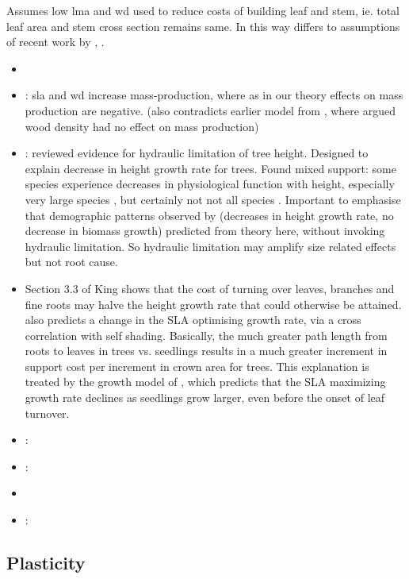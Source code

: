 \documentclass[a4paper,11pt]{article}
\begin{document}
Assumes low lma and wd used to reduce costs of building leaf and stem, ie. total leaf area and stem cross section remains same. In this way differs to assumptions of recent work by \citep{Anten-2010}, \citep{Larjavaara-2010}.



\begin{itemize}
  \item \citet{Ishihara-2016}
  \item  \citet{Enquist-2007}: sla and wd increase mass-production, where as in our theory effects on mass production are negative. (also contradicts earlier model from \citet{Enquist-1999}, where argued wood density had no effect on mass production)
  \item \citet{Ryan-2006}: reviewed evidence for hydraulic limitation of tree height. Designed to explain decrease in height growth rate for trees. Found mixed support: some species experience decreases in physiological function with height, especially very large species \citep{Koch-2004}, but certainly not not all species \citep{Ryan-2006}. Important to emphasise that demographic patterns observed by \citep{Ryan-2006} (decreases in height growth rate, no decrease in biomass growth) predicted from theory here, without invoking hydraulic limitation. So hydraulic limitation may amplify size related effects but not root cause.
  \item \citet{King-2005} Section 3.3 of King  shows that the cost of turning over leaves, branches and fine roots may halve the height growth rate that could otherwise be attained. \citet{King-1999} also predicts a change in the SLA optimising growth rate, via a cross correlation with self shading. Basically, the much greater path length from roots to leaves in trees vs. seedlings results in a much greater increment in support cost per increment in crown area for trees. This explanation is treated by the growth model of \citet{King-1999}, which predicts that the SLA maximizing growth rate declines as seedlings grow larger, even before the onset of leaf turnover.
  \item \citet{King-1999}:
  \item \citet{Li-2014}:
  \item \citep{Givnish-1988,Yokozawa-1995,Makela-1997,King-2011,Moorcroft-2001}
  \item \citep{Coomes-2011}:
\end{itemize}

\subsection{Plasticity}
\end{document}
